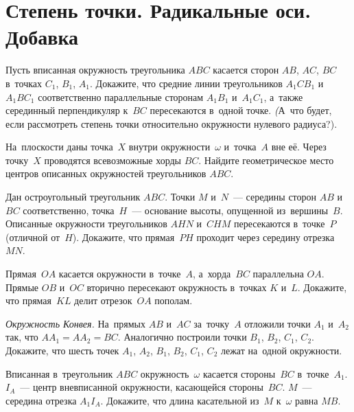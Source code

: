 
\section*{Степень точки. Радикальные оси. Добавка}

\begin{problems}

\item
Пусть вписанная окружность треугольника $ABC$ касается сторон $AB$, $AC$, $BC$
в~точках $C_1$, $B_1$, $A_1$.
Докажите, что средние линии треугольников $A_1 CB_1$ и~$A_1 B C_1$
соответственно параллельные сторонам $A_1 B_1$ и~$A_1 C_1$, а~также серединный
перпендикуляр к~$BC$ пересекаются в~одной точке.
\emph(А~что будет, если рассмотреть степень точки относительно окружности
нулевого радиуса?).

\item
На~плоскости даны точка~$X$ внутри окружности~$\omega$ и~точка~$A$ вне её.
Через точку~$X$ проводятся всевозможные хорды $BC$.
Найдите геометрическое место центров описанных окружностей треугольников $ABC$.

\item
Дан остроугольный треугольник $ABC$.
Точки $M$ и~$N$~--- середины сторон $AB$ и~$BC$ соответственно, точка~$H$~---
основание высоты, опущенной из~вершины~$B$.
Описанные окружности треугольников $AHN$ и~$CHM$ пересекаются в~точке~$P$
(отличной от~$H$).
Докажите, что прямая~$PH$ проходит через середину отрезка~$MN$.

\item
Прямая~$OA$ касается окружности в~точке~$A$, а~хорда~$BC$ параллельна $OA$.
Прямые $OB$ и~$OC$ вторично пересекают окружность в~точках $K$ и~$L$.
Докажите, что прямая~$KL$ делит отрезок~$OA$ пополам.

\item\emph{Окружность Конвея.}
На~прямых $AB$ и~$AC$ за~точку~$A$ отложили точки $A_1$ и~$A_2$ так, что
$A A_1 = A A_2 = BC$.
Аналогично построили точки $B_1$, $B_2$, $C_1$, $C_2$.
Докажите, что шесть точек $A_1$, $A_2$, $B_1$, $B_2$, $C_1$, $C_2$ лежат
на~одной окружности.

\item
Вписанная в~треугольник $ABC$ окружность~$\omega$ касается стороны~$BC$
в~точке~$A_1$.
$I_A$~--- центр вневписанной окружности, касающейся стороны~$BC$.
$M$~--- середина отрезка $A_1 I_A$.
Докажите, что длина касательной из~$M$ к~$\omega$ равна $MB$.


\end{problems}

